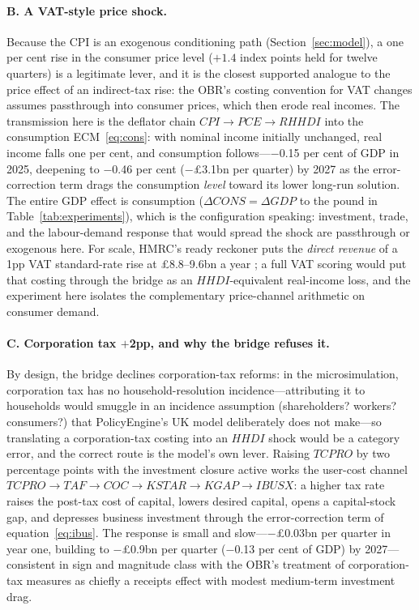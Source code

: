\paragraph{B. A VAT-style price shock.} Because the CPI is an exogenous conditioning path (Section~\ref{sec:model}), a one per cent rise in the consumer price level ($+1.4$ index points held for twelve quarters) is a legitimate lever, and it is the closest supported analogue to the price effect of an indirect-tax rise: the OBR's costing convention for VAT changes assumes passthrough into consumer prices, which then erode real incomes. The transmission here is the deflator chain $CPI \to PCE \to RHHDI$ into the consumption ECM~\eqref{eq:cons}: with nominal income initially unchanged, real income falls one per cent, and consumption follows---$-$0.15 per cent of GDP in 2025, deepening to $-$0.46 per cent ($-$\pounds 3.1bn per quarter) by 2027 as the error-correction term drags the consumption \emph{level} toward its lower long-run solution. The entire GDP effect is consumption ($\Delta CONS = \Delta GDP$ to the pound in Table~\ref{tab:experiments}), which is the configuration speaking: investment, trade, and the labour-demand response that would spread the shock are passthrough or exogenous here. For scale, HMRC's ready reckoner puts the \emph{direct revenue} of a 1pp VAT standard-rate rise at \pounds 8.8--9.6bn a year \citep{hmrc2025reckoner}; a full VAT scoring would put that costing through the bridge as an $HHDI$-equivalent real-income loss, and the experiment here isolates the complementary price-channel arithmetic on consumer demand.

\paragraph{C. Corporation tax $+$2pp, and why the bridge refuses it.} By design, the bridge declines corporation-tax reforms: in the microsimulation, corporation tax has no household-resolution incidence---attributing it to households would smuggle in an incidence assumption (shareholders? workers? consumers?) that PolicyEngine's UK model deliberately does not make---so translating a corporation-tax costing into an $HHDI$ shock would be a category error, and the correct route is the model's own lever. Raising $TCPRO$ by two percentage points with the investment closure active works the user-cost channel $TCPRO \to TAF \to COC \to KSTAR \to KGAP \to IBUSX$: a higher tax rate raises the post-tax cost of capital, lowers desired capital, opens a capital-stock gap, and depresses business investment through the error-correction term of equation~\eqref{eq:ibus}. The response is small and slow---$-$\pounds 0.03bn per quarter in year one, building to $-$\pounds 0.9bn per quarter ($-$0.13 per cent of GDP) by 2027---consistent in sign and magnitude class with the OBR's treatment of corporation-tax measures as chiefly a receipts effect with modest medium-term investment drag.

